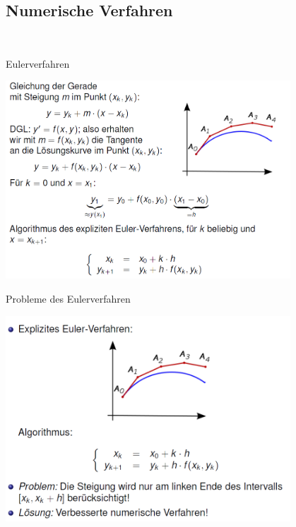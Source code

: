 \subsection{Numerische Verfahren}\\
\begin{definition}{Eulerverfahren}\\
  \begin{centering}
  \includegraphics[width=0.8\textwidth]{images/2024-06-02-22-23-19.png}\\
  \end{centering}
\end{definition}
\begin{definition}{Probleme des Eulerverfahren}\\
  \begin{centering}
  \includegraphics[width=0.8\textwidth]{images/2024-06-02-22-24-08.png}\\
  \end{centering}
\end{definition}
